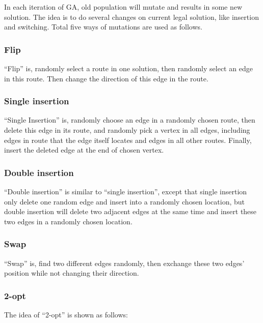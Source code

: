 \documentclass[journal]{IEEEtran}
\begin{document}
	In each iteration of GA, old population will mutate and results in some new solution. The idea is to do several changes on current legal solution, like insertion and switching. Total five ways of mutations are used as follows.
	
	\subsubsection{Flip}
	
	``Flip'' is, randomly select a route in one solution, then randomly select an edge in this route. Then change the direction of this edge in the route.
	
	\subsubsection{Single insertion}
	
	``Single Insertion'' is, randomly choose an edge in a randomly chosen route, then delete this edge in its route, and randomly pick a vertex in all edges, including edges in route that the edge itself locates and edges in all other routes. Finally, insert the deleted edge at the end of chosen vertex.
	
	\subsubsection{Double insertion}
	
	``Double insertion'' is similar to ``single insertion'', except that single insertion only delete one random edge and insert into a randomly chosen location, but double insertion will delete two adjacent edges at the same time and insert these two edges in a randomly chosen location.
	
	\subsubsection{Swap}
	
	``Swap'' is, find two different edges randomly, then exchange these two edges' position while not changing their direction.
	
	\subsubsection{2-opt}
	
	The idea of ``2-opt'' is shown as follows:
	
\end{document}
